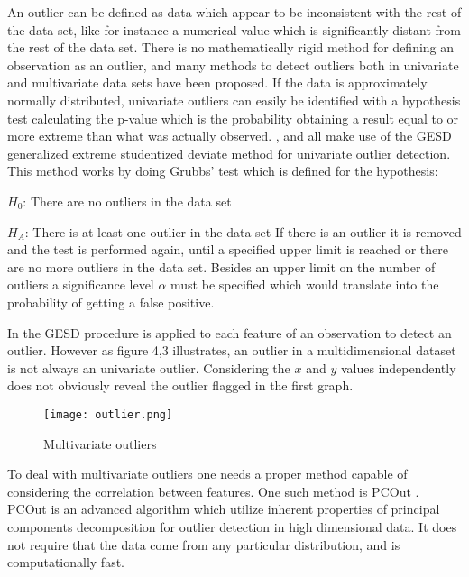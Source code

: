 An outlier can be defined as data which appear to be inconsistent with the rest of the data set, like for instance a numerical value which is significantly distant from the rest of the data set. There is no mathematically rigid method for defining an observation as an outlier, and many methods to detect outliers both in univariate and multivariate data sets have been proposed. If the data is approximately normally distributed, univariate outliers can easily be identified with a hypothesis test calculating the p-value which is the probability obtaining a result equal to or more extreme than what was actually observed. \cite{faultdetec2}, \cite{faultdetec3} and \cite{faultdetec4} all make use of the GESD generalized extreme studentized deviate method for univariate outlier detection. This method works by doing Grubbs’ test which is defined for the hypothesis:
\newline

$H_0$: There are no outliers in the data set
\newline

$H_A$: There is at least one outlier in the data set 
\newline
\newline
If there is an outlier it is removed and the test is performed again, until a specified upper limit is reached or there are no more outliers in the data set. Besides an upper limit on the number of outliers a significance level $\alpha$ must be specified which would translate into the probability of getting a false positive. 

In \cite{faultdetec2} the GESD procedure is applied to each feature of an observation to detect an outlier. However as figure 4,3 illustrates, an outlier in a multidimensional dataset is not always an univariate outlier. Considering the $x$ and $y$ values independently does not obviously reveal the outlier flagged in the first graph. 
\begin{figure}
\begin{center}
\texttt{[image: outlier.png]}
\end{center}
\caption{Multivariate outliers}
\end{figure}
To deal with multivariate outliers one needs a proper method capable of considering the correlation between features. One such method is PCOut \cite{OutDetec1}. PCOut is an advanced algorithm which utilize inherent properties of principal components decomposition for outlier detection in high dimensional data. It does not require that the data come from any particular distribution, and is computationally fast.
